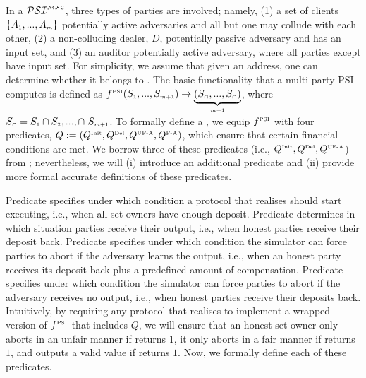   
In a  $\mathcal{PSI}^{\scriptscriptstyle \mathcal{MFC}}$, three types of parties are involved; namely, (1) a set of clients $\{A_{\scriptscriptstyle 1},...,A_{\scriptscriptstyle m}\}$ potentially active adversaries and all but one may collude with each other, (2) a non-colluding dealer, $D$, potentially passive adversary and has an input set, and (3) an auditor \aud potentially active adversary, where all parties except \aud have input set. For simplicity, we assume that given an address,  one can determine whether it belongs to \aud. 
% 
The basic functionality that a multi-party PSI computes is defined as $f^{\scriptscriptstyle\text{PSI}} (S_{\scriptscriptstyle 1},..., S_{\scriptscriptstyle m+1})\rightarrow\underbrace{(S_{\scriptscriptstyle\cap},..., S_{\scriptscriptstyle\cap})}_{\scriptscriptstyle m+1}$, where $S_{\scriptscriptstyle\cap}= S_{\scriptscriptstyle 1} \cap S_{\scriptscriptstyle 2}, ...,\cap\  S_{\scriptscriptstyle m+1}$.  To formally define a \p, we equip $f^{\scriptscriptstyle\text{PSI}}$ with four predicates,  $Q:=(Q^{\scriptscriptstyle \text{Init}}, Q^{\scriptscriptstyle \text{Del}}, Q^{\scriptscriptstyle \text{UF-A}}, Q^{\scriptscriptstyle \text{F-A}})$, which ensure that certain financial conditions are met. 
   We borrow three of these predicates (i.e., $Q^{\scriptscriptstyle \text{Init}}, Q^{\scriptscriptstyle \text{Del}}, Q^{\scriptscriptstyle \text{UF-A}}$) from \cite{KiayiasZZ16}; nevertheless, we will (i) introduce an additional predicate  \qFAbt and (ii) provide more formal accurate definitions of these predicates. 
   
Predicate \qinit specifies under which condition a protocol that realises \p should start executing, i.e., when all set owners have enough deposit. Predicate \qdel determines in which situation parties receive their output, i.e., when honest parties receive their deposit back. Predicate \qUnFAbt specifies under which condition the simulator can force parties to abort if the adversary learns the output,  i.e., when an honest party receives its deposit back plus a predefined amount of compensation. Predicate \qFAbt specifies under which condition the simulator can force parties to abort if the adversary receives no output, i.e., when honest parties receive their deposits back. 
%
%
Intuitively, by requiring any protocol that realises \p to implement a wrapped version of $f^{\scriptscriptstyle\text{PSI}}$ that includes $Q$, we will ensure that an honest set owner only aborts in an unfair manner if \qUnFAbt returns  $1$, it only aborts in a fair manner if \qFAbt returns  $1$, and outputs a valid value if \qdel returns $1$. Now, we formally define each of these predicates.  
 


